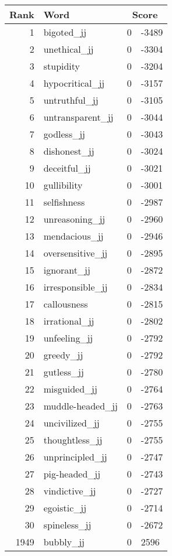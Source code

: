 \begin{longtable}[!htbp]{| rlr@{.}l |}
    \hline
    \textbf{Rank} & \textbf{Word} & \multicolumn{2}{c|}{\textbf{Score}} \\
    \hline
    \endhead
    1 & bigoted\_jj & 0 & -3489 \\
    2 & unethical\_jj & 0 & -3304 \\
    3 & stupidity & 0 & -3204 \\
    4 & hypocritical\_jj & 0 & -3157 \\
    5 & untruthful\_jj & 0 & -3105 \\
    6 & untransparent\_jj & 0 & -3044 \\
    7 & godless\_jj & 0 & -3043 \\
    8 & dishonest\_jj & 0 & -3024 \\
    9 & deceitful\_jj & 0 & -3021 \\
    10 & gullibility & 0 & -3001 \\
    11 & selfishness & 0 & -2987 \\
    12 & unreasoning\_jj & 0 & -2960 \\
    13 & mendacious\_jj & 0 & -2946 \\
    14 & oversensitive\_jj & 0 & -2895 \\
    15 & ignorant\_jj & 0 & -2872 \\
    16 & irresponsible\_jj & 0 & -2834 \\
    17 & callousness & 0 & -2815 \\
    18 & irrational\_jj & 0 & -2802 \\
    19 & unfeeling\_jj & 0 & -2792 \\
    20 & greedy\_jj & 0 & -2792 \\
    21 & gutless\_jj & 0 & -2780 \\
    22 & misguided\_jj & 0 & -2764 \\
    23 & muddle-headed\_jj & 0 & -2763 \\
    24 & uncivilized\_jj & 0 & -2755 \\
    25 & thoughtless\_jj & 0 & -2755 \\
    26 & unprincipled\_jj & 0 & -2747 \\
    27 & pig-headed\_jj & 0 & -2743 \\
    28 & vindictive\_jj & 0 & -2727 \\
    29 & egoistic\_jj & 0 & -2714 \\
    30 & spineless\_jj & 0 & -2672 \\
    1949 & bubbly\_jj & 0 & 2596 \\

\end{longtable}
